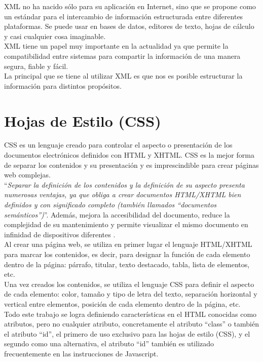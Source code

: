 XML no ha nacido s\'olo para su aplicaci\'on en Internet, sino que se propone como un est\'andar para el intercambio de informaci\'on estructurada entre diferentes plataformas. Se puede usar en bases de datos, editores de texto, hojas de c\'alculo y casi cualquier cosa imaginable.\\

XML tiene un papel muy importante en la actualidad ya que permite la compatibilidad entre sistemas para compartir la informaci\'on de una manera segura, fiable y f\'acil.\\

La principal que se tiene al utilizar XML es que nos es posible estructurar la informaci\'on para distintos prop\'ositos.

\section{Hojas de Estilo (CSS)}
CSS es un lenguaje creado para controlar el aspecto o presentaci\'on de los documentos electr\'onicos definidos con HTML y XHTML. CSS es la mejor forma de separar los contenidos y su presentaci\'on y es imprescindible para crear p\'aginas web complejas.\\

``\textit{Separar la definici\'on de los contenidos y la definici\'on de su aspecto presenta numerosas ventajas, ya que obliga a crear documentos HTML/XHTML bien definidos y con significado completo (tambi\'en llamados ``documentos sem\'anticos'')}''. Adem\'as, mejora la accesibilidad del documento, reduce la complejidad de su mantenimiento y permite visualizar el mismo documento en infinidad de dispositivos diferentes \cite{css}.\\

Al crear una p\'agina web, se utiliza en primer lugar el lenguaje HTML/XHTML para marcar  los contenidos, es decir, para designar la funci\'on de cada elemento dentro de la p\'agina: p\'arrafo, titular, texto destacado, tabla, lista de elementos, etc.\\

Una vez creados los contenidos, se utiliza el lenguaje CSS para definir el aspecto de cada elemento: color, tama\~no y tipo de letra del texto, separaci\'on horizontal y vertical entre elementos,  posici\'on de cada elemento dentro de la p\'agina, etc.\\

Todo este trabajo se logra definiendo caracter\'isticas en el HTML conocidas como atributos, pero no cualquier atributo, concretamente el atributo ``class'' o tambi\'en el atributo ``id'', el primero de uso exclusivo para las hojas de estilo (CSS), y el segundo como una alternativa, el atributo ``id'' tambi\'en es utilizado frecuentemente en las instrucciones de Javascript.

